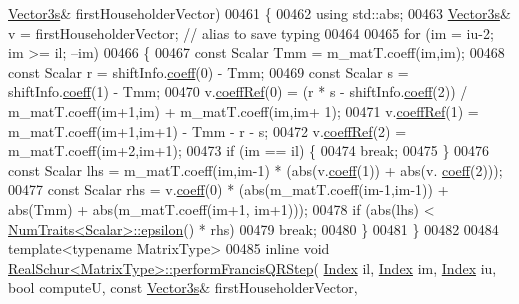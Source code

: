\begin{DoxyCode}
      \hyperlink{group___core___module}{Vector3s}& firstHouseholderVector)
00461 \{
00462   \textcolor{keyword}{using} std::abs;
00463   \hyperlink{group___core___module}{Vector3s}& v = firstHouseholderVector; \textcolor{comment}{// alias to save typing}
00464 
00465   \textcolor{keywordflow}{for} (im = iu-2; im >= il; --im)
00466   \{
00467     \textcolor{keyword}{const} Scalar Tmm = m\_matT.coeff(im,im);
00468     \textcolor{keyword}{const} Scalar r = shiftInfo.\hyperlink{class_eigen_1_1_plain_object_base_afbfc12954f16d21aedb7bd839f64a278}{coeff}(0) - Tmm;
00469     \textcolor{keyword}{const} Scalar s = shiftInfo.\hyperlink{class_eigen_1_1_plain_object_base_afbfc12954f16d21aedb7bd839f64a278}{coeff}(1) - Tmm;
00470     v.\hyperlink{class_eigen_1_1_plain_object_base_a25626a55b26a4323565f79d1b7c48ea8}{coeffRef}(0) = (r * s - shiftInfo.\hyperlink{class_eigen_1_1_plain_object_base_afbfc12954f16d21aedb7bd839f64a278}{coeff}(2)) / m\_matT.coeff(im+1,im) + m\_matT.coeff(im,im+
      1);
00471     v.\hyperlink{class_eigen_1_1_plain_object_base_a25626a55b26a4323565f79d1b7c48ea8}{coeffRef}(1) = m\_matT.coeff(im+1,im+1) - Tmm - r - s;
00472     v.\hyperlink{class_eigen_1_1_plain_object_base_a25626a55b26a4323565f79d1b7c48ea8}{coeffRef}(2) = m\_matT.coeff(im+2,im+1);
00473     \textcolor{keywordflow}{if} (im == il) \{
00474       \textcolor{keywordflow}{break};
00475     \}
00476     \textcolor{keyword}{const} Scalar lhs = m\_matT.coeff(im,im-1) * (abs(v.\hyperlink{class_eigen_1_1_plain_object_base_afbfc12954f16d21aedb7bd839f64a278}{coeff}(1)) + abs(v.
      \hyperlink{class_eigen_1_1_plain_object_base_afbfc12954f16d21aedb7bd839f64a278}{coeff}(2)));
00477     \textcolor{keyword}{const} Scalar rhs = v.\hyperlink{class_eigen_1_1_plain_object_base_afbfc12954f16d21aedb7bd839f64a278}{coeff}(0) * (abs(m\_matT.coeff(im-1,im-1)) + abs(Tmm) + abs(m\_matT.coeff(im+1,
      im+1)));
00478     \textcolor{keywordflow}{if} (abs(lhs) < \hyperlink{group___core___module_struct_eigen_1_1_num_traits}{NumTraits<Scalar>::epsilon}() * rhs)
00479       \textcolor{keywordflow}{break};
00480   \}
00481 \}
00482 
00484 \textcolor{keyword}{template}<\textcolor{keyword}{typename} MatrixType>
00485 \textcolor{keyword}{inline} \textcolor{keywordtype}{void} \hyperlink{group___eigenvalues___module_class_eigen_1_1_real_schur}{RealSchur<MatrixType>::performFrancisQRStep}(
      \hyperlink{group___eigenvalues___module_a8bd4653e2d9569a44ecc95e746422d3f}{Index} il, \hyperlink{group___eigenvalues___module_a8bd4653e2d9569a44ecc95e746422d3f}{Index} im, \hyperlink{group___eigenvalues___module_a8bd4653e2d9569a44ecc95e746422d3f}{Index} iu, \textcolor{keywordtype}{bool} computeU, \textcolor{keyword}{const} \hyperlink{group___core___module}{Vector3s}& firstHouseholderVector,

\end{DoxyCode}
